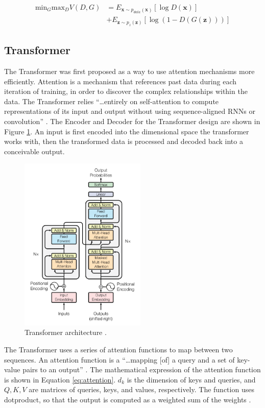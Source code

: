 \documentclass[letterpaper]{article} %
\begin{document}
\begin{equation}
\label{eq:gan_basic}
\begin{split}
\text{min}_G\text{max}_DV(D,G) &=
E_{\mathbf{x}\sim p_{data}(\mathbf{x})}[\log D(\mathbf{x})] \\
&+ E_{\mathbf{z}\sim p_{z}(\mathbf{z})}[\log(1 - D(G(\mathbf{z})))]
\end{split}
\end{equation}

\subsection{Transformer}
The Transformer was first proposed
as a way to use attention mechanisms more efficiently.
Attention is a mechanism that references past data during each iteration of training,
in order to discover the complex relationships within the data.
The Transformer relies
``\dots entirely on self-attention to compute representations of its input and output
without using sequence-aligned RNNs or convolution''
\cite{attention_need}.
The Encoder and Decoder for the Transformer design
are shown in Figure \ref{fig:attention}.
An input is first encoded into the dimensional space
the transformer works with,
then the transformed data is processed
and decoded back into a conceivable output.

\begin{figure}[htbp]
\centerline{\includegraphics[width=6cm]{attention_architecture.png}}
\caption{Transformer architecture
\cite{attention_need}.}
\label{fig:attention}
\end{figure}

The Transformer uses a series of attention functions to map
between two sequences.
An attention function is a
``\dots mapping [of] a query and a
set of key-value pairs to an output''
\cite{attention_need}.
The mathematical expression of the attention function is shown in
Equation \ref{eq:attention}.
$d_k$ is the dimension of keys and queries, and
$Q,K,V$ are matrices of queries, keys, and values, respectively.
The function uses dotproduct, so that the output is computed as
a weighted sum of the weights
\cite{attention_need}.
\end{document}
